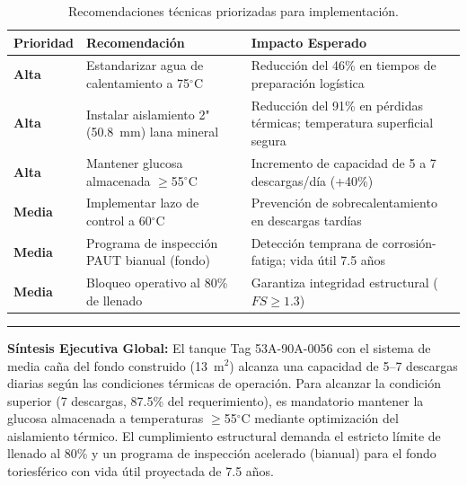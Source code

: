 \documentclass[11pt,a4paper]{article}
\begin{document}
\begin{table}[H]
\centering
\footnotesize
\caption{Recomendaciones técnicas priorizadas para implementación.}
\label{tab:recomendaciones}
\begin{tabular}{@{}p{2.0cm}p{5.5cm}p{5.5cm}@{}}
\toprule
\textbf{Prioridad} & \textbf{Recomendación} & \textbf{Impacto Esperado} \\
\midrule
\textbf{Alta} & Estandarizar agua de calentamiento a 75$^\circ$C & Reducción del 46\% en tiempos de preparación logística \\
\midrule
\textbf{Alta} & Instalar aislamiento 2" (50.8~mm) lana mineral & Reducción del 91\% en pérdidas térmicas; temperatura superficial segura \\
\midrule
\textbf{Alta} & Mantener glucosa almacenada $\geq$55$^\circ$C & Incremento de capacidad de 5 a 7 descargas/día (+40\%) \\
\midrule
\textbf{Media} & Implementar lazo de control a 60$^\circ$C & Prevención de sobrecalentamiento en descargas tardías \\
\midrule
\textbf{Media} & Programa de inspección PAUT bianual (fondo) & Detección temprana de corrosión-fatiga; vida útil 7.5 años \\
\midrule
\textbf{Media} & Bloqueo operativo al 80\% de llenado & Garantiza integridad estructural ($FS \geq 1.3$) \\
\bottomrule
\end{tabular}
\end{table}

\vspace{0.3cm}
\noindent\rule{\textwidth}{0.4pt}
\vspace{0.2cm}

\noindent\textbf{Síntesis Ejecutiva Global:} El tanque Tag 53A-90A-0056 con el sistema de media caña del fondo construido (13~m$^2$) alcanza una capacidad de 5--7 descargas diarias según las condiciones térmicas de operación. Para alcanzar la condición superior (7 descargas, 87.5\% del requerimiento), es mandatorio mantener la glucosa almacenada a temperaturas $\geq$55$^\circ$C mediante optimización del aislamiento térmico. El cumplimiento estructural demanda el estricto límite de llenado al 80\% y un programa de inspección acelerado (bianual) para el fondo toriesférico con vida útil proyectada de 7.5 años.
\end{document}
